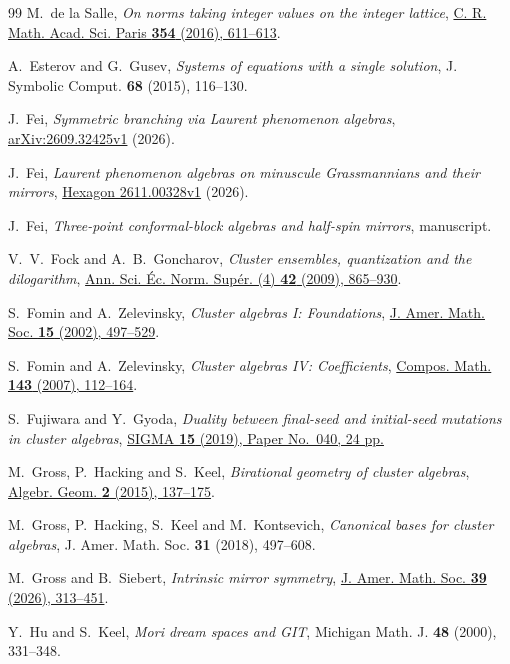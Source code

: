 \documentclass[11pt,reqno]{amsart}
\numberwithin{equation}{section}
\theoremstyle{definition}
\theoremstyle{remark}
\begin{document}
\begin{thebibliography}{99}
M.~de la Salle, \emph{On norms taking integer values on the integer lattice},
\href{https://doi.org/10.1016/j.crma.2016.04.003}{C. R. Math. Acad. Sci. Paris \textbf{354} (2016), 611--613}.

A.~Esterov and G.~Gusev, \emph{Systems of equations with a single solution},
J. Symbolic Comput. \textbf{68} (2015), 116--130.

J.~Fei, \emph{Symmetric branching via Laurent phenomenon algebras},
\href{https://arxiv.org/abs/2609.32425v1}{arXiv:2609.32425v1} (2026).

J.~Fei, \emph{Laurent phenomenon algebras on minuscule Grassmannians and their mirrors},
\href{https://hexagonmath.org/2611.00328v1}{Hexagon 2611.00328v1} (2026).

J.~Fei, \emph{Three-point conformal-block algebras and half-spin mirrors}, manuscript.

V.~V.~Fock and A.~B.~Goncharov, \emph{Cluster ensembles, quantization
and the dilogarithm},
\href{https://doi.org/10.24033/asens.2112}{Ann. Sci. \'{E}c. Norm. Sup\'er. (4) \textbf{42} (2009), 865--930}.

S.~Fomin and A.~Zelevinsky, \emph{Cluster algebras I: Foundations},
\href{https://doi.org/10.1090/S0894-0347-01-00385-X}{J. Amer. Math. Soc. \textbf{15} (2002), 497--529}.

S.~Fomin and A.~Zelevinsky, \emph{Cluster algebras IV: Coefficients},
\href{https://doi.org/10.1112/S0010437X06002521}{Compos. Math. \textbf{143} (2007), 112--164}.

S.~Fujiwara and Y.~Gyoda, \emph{Duality between final-seed and initial-seed mutations in cluster algebras},
\href{https://doi.org/10.3842/SIGMA.2019.040}{SIGMA \textbf{15} (2019), Paper No.~040, 24 pp.}

M.~Gross, P.~Hacking and S.~Keel, \emph{Birational geometry of cluster algebras},
\href{https://doi.org/10.14231/AG-2015-007}{Algebr. Geom. \textbf{2} (2015), 137--175}.

M.~Gross, P.~Hacking, S.~Keel and M.~Kontsevich,
\emph{Canonical bases for cluster algebras},
J. Amer. Math. Soc. \textbf{31} (2018), 497--608.

M.~Gross and B.~Siebert, \emph{Intrinsic mirror symmetry},
\href{https://doi.org/10.1090/jams/1066}{J. Amer. Math. Soc. \textbf{39} (2026), 313--451}.

Y.~Hu and S.~Keel, \emph{Mori dream spaces and GIT},
Michigan Math. J. \textbf{48} (2000), 331--348.


\end{thebibliography}
\end{document}
